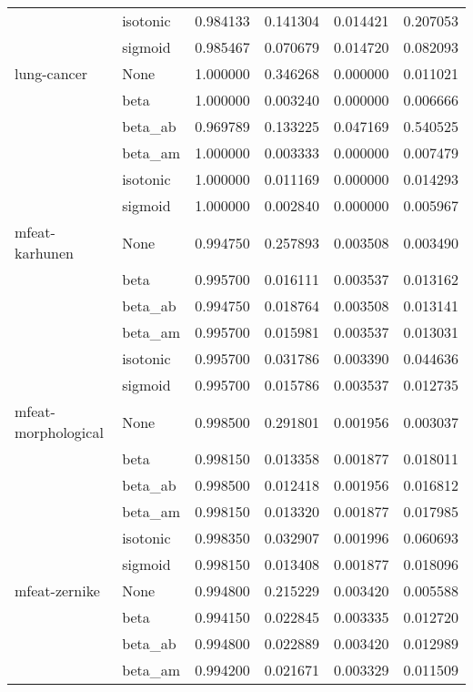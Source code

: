 \begin{tabular}{llrrrr}
        & isotonic &  0.984133 &  0.141304 &  0.014421 &  0.207053 \\
        & sigmoid &  0.985467 &  0.070679 &  0.014720 &  0.082093 \\
lung-cancer & None &  1.000000 &  0.346268 &  0.000000 &  0.011021 \\
        & beta &  1.000000 &  0.003240 &  0.000000 &  0.006666 \\
        & beta\_ab &  0.969789 &  0.133225 &  0.047169 &  0.540525 \\
        & beta\_am &  1.000000 &  0.003333 &  0.000000 &  0.007479 \\
        & isotonic &  1.000000 &  0.011169 &  0.000000 &  0.014293 \\
        & sigmoid &  1.000000 &  0.002840 &  0.000000 &  0.005967 \\
mfeat-karhunen & None &  0.994750 &  0.257893 &  0.003508 &  0.003490 \\
        & beta &  0.995700 &  0.016111 &  0.003537 &  0.013162 \\
        & beta\_ab &  0.994750 &  0.018764 &  0.003508 &  0.013141 \\
        & beta\_am &  0.995700 &  0.015981 &  0.003537 &  0.013031 \\
        & isotonic &  0.995700 &  0.031786 &  0.003390 &  0.044636 \\
        & sigmoid &  0.995700 &  0.015786 &  0.003537 &  0.012735 \\
mfeat-morphological & None &  0.998500 &  0.291801 &  0.001956 &  0.003037 \\
        & beta &  0.998150 &  0.013358 &  0.001877 &  0.018011 \\
        & beta\_ab &  0.998500 &  0.012418 &  0.001956 &  0.016812 \\
        & beta\_am &  0.998150 &  0.013320 &  0.001877 &  0.017985 \\
        & isotonic &  0.998350 &  0.032907 &  0.001996 &  0.060693 \\
        & sigmoid &  0.998150 &  0.013408 &  0.001877 &  0.018096 \\
mfeat-zernike & None &  0.994800 &  0.215229 &  0.003420 &  0.005588 \\
        & beta &  0.994150 &  0.022845 &  0.003335 &  0.012720 \\
        & beta\_ab &  0.994800 &  0.022889 &  0.003420 &  0.012989 \\
        & beta\_am &  0.994200 &  0.021671 &  0.003329 &  0.011509 \\

\end{tabular}
